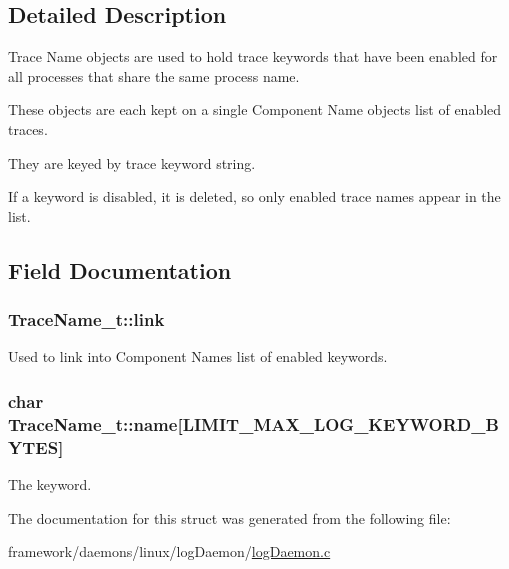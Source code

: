 \subsection{Detailed Description}
Trace Name objects are used to hold trace keywords that have been enabled for all processes that share the same process name.

These objects are each kept on a single Component Name object\textquotesingle{}s list of enabled traces.

They are keyed by trace keyword string.

If a keyword is disabled, it is deleted, so only enabled trace names appear in the list. 

\subsection{Field Documentation}
\subsubsection[{\texorpdfstring{link}{link}}]{ Trace\+Name\+\_\+t\+::link}\hypertarget{struct_trace_name__t_a37288b01e721122d56e64f0c43992f07}{}\label{struct_trace_name__t_a37288b01e721122d56e64f0c43992f07}


Used to link into Component Name\textquotesingle{}s list of enabled keywords. 

\subsubsection[{\texorpdfstring{name}{name}}]{\setlength{\rightskip}{0pt plus 5cm}char Trace\+Name\+\_\+t\+::name\mbox{[}{\bf L\+I\+M\+I\+T\+\_\+\+M\+A\+X\+\_\+\+L\+O\+G\+\_\+\+K\+E\+Y\+W\+O\+R\+D\+\_\+\+B\+Y\+T\+ES}\mbox{]}}\hypertarget{struct_trace_name__t_a283445caccf888b745e251f73043c844}{}\label{struct_trace_name__t_a283445caccf888b745e251f73043c844}


The keyword. 



The documentation for this struct was generated from the following file\+:\begin{DoxyCompactItemize}
\item 
framework/daemons/linux/log\+Daemon/\hyperlink{log_daemon_8c}{log\+Daemon.\+c}\end{DoxyCompactItemize}
